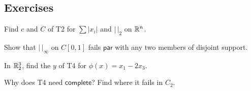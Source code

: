 \subsection*{Exercises}

\begin{lines}
\item[\lab{E1}] Find $c$ and $C$ of T2 for $\sum |x_i|$ and $|\,|_2$ on $\mathbb{R}^n$.
\item[\lab{E2}] Show that $|\,|_\infty$ on $C[0, 1]$ fails $\mathsf{par}$ with any two members of disjoint support.
\item[\lab{E3}] In $\mathbb{R}^3_2$, find the $y$ of T4 for $\phi(x) = x_1 - 2x_3$.
\item[\lab{E4}] Why does T4 need $\mathsf{complete}$? Find where it fails in $C_2$.
\end{lines}
